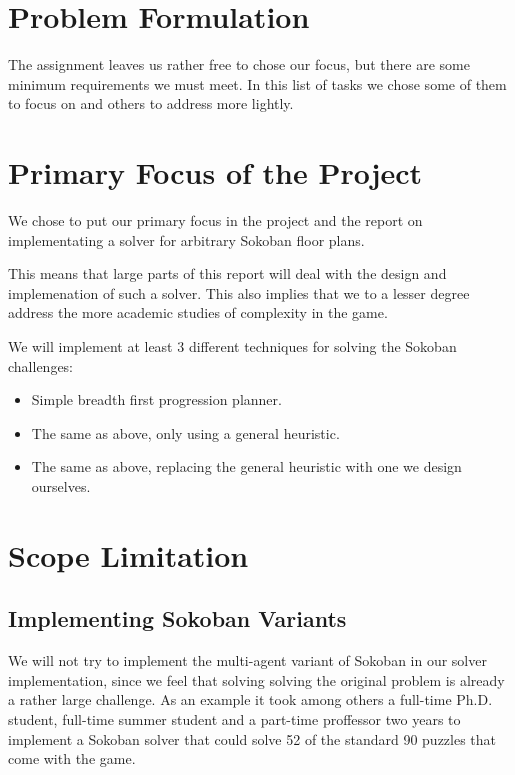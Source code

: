 \section{Problem Formulation}

The assignment leaves us rather free to chose our focus, but there are
some minimum requirements we must meet. In this list of tasks we chose
some of them to focus on and others to address more lightly.

\section{Primary Focus of the Project}
We chose to put our primary focus in the project and the report on
implementating a solver for arbitrary Sokoban floor plans.

This means that large parts of this report will deal with the design
and implemenation of such a solver. This also implies that we to a
lesser degree address the more academic studies of complexity in the
game.

We will implement at least 3 different techniques for solving the
Sokoban challenges:
\begin{itemize}
\item Simple breadth first progression planner. %
\item The same as above, only using a general heuristic. %
\item The same as above, replacing the general heuristic with one we
  design ourselves.
\end{itemize}



\section{Scope Limitation}
\label{sec:scope}
\subsection{Implementing Sokoban Variants}
We will not try to implement the multi-agent variant of Sokoban in our
solver implementation, since we feel that solving solving the original
problem is already a rather large challenge. As an example it took
among others a full-time Ph.D. student, full-time summer student and a
part-time proffessor two years to implement a Sokoban solver that
could solve 52 of the standard 90 puzzles that come with the
game. \citep{Junghanns99domain-dependentsingle-agent}

